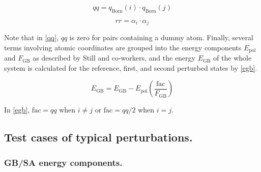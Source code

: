 \documentclass[12pt]{report}
\begin{document}
\begin{equation}
\label{qq}
qq = q_{ \textrm{Born}}(i) \cdot q_{ \textrm{Born}}(j)
\end{equation}
\vspace*{-1.7cm}

\begin{equation}
\label{rr}
rr = \alpha_{i} \cdot \alpha_{j} 
\end{equation}
\vspace*{-0.8cm}

Note that in \cref{qq}, $qq$ is zero for pairs containing a dummy atom. Finally, several terms involving atomic coordinates are grouped into the energy components $E_{ \textrm{pol}}$ and $F_{ \textrm{GB}}$ as described by Still and co-workers,\cite{qiu} and the energy $E_{ \textrm{GB}}$ of the whole system is calculated for the reference, first, and second perturbed states by \cref{egb}.

\vspace*{-0.1cm}
\begin{equation}
\label{egb}
E_{\textrm{GB}} = E_{\textrm{GB}} - E_{\textrm{pol}} \left( \frac{\textrm{fac}}{F_{\textrm{GB}}} \right)
\end{equation}
\vspace*{-0.45cm}

In \cref{egb}, $\textrm{fac} = qq$ when $i \neq j$ or $\textrm{fac} = qq/2$ when $i = j$.


\subsection{Test cases of typical perturbations.}

\subsubsection{GB/SA energy components.}
\end{document}
